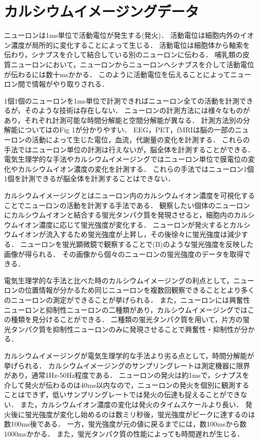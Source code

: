 \section{カルシウムイメージングデータ}
ニューロンは1ms単位で活動電位が発生する(発火)．
活動電位は細胞内外のイオン濃度が局所的に変化することによって生じる．
活動電位は細胞体から軸索を伝わり，シナプスを介して結合している別のニューロンに伝わる．
哺乳類の皮質ニューロンにおいて，ニューロンからニューロンへシナプスを介して活動電位が伝わるには数十msかかる\cite{Izhikevich2004}．
このように活動電位を伝えることによってニューロン間で情報がやり取りされる．

1個1個のニューロンを1ms単位で計測できればニューロン全ての活動を計測できるが，そのような技術は存在しない．
ニューロンの計測方法には様々なものがあり，それぞれ計測可能な時間分解能と空間分解能が異なる．
計測方法別の分解能については\cite{Sejnowski2014}のFig 1が分かりやすい．
EEG，PET，fMRIは脳の一部のニューロンの活動によって生じた電位，血流，代謝量の変化を計測する．
これらの手法ではニューロン単位の計測は行えないが，脳全体を計測することができる．
電気生理学的な手法やカルシウムイメージングではニューロン単位で膜電位の変化やカルシウムイオン濃度の変化を計測する．
これらの手法ではニューロン1個1個を計測できるが脳全体を計測することはできない．

カルシウムイメージングとはニューロン内のカルシウムイオン濃度を可視化することでニューロンの活動を計測する手法である．
観察したい個体のニューロンにカルシウムイオンと結合する蛍光タンパク質を発現させると，細胞内のカルシウムイオン濃度に応じて蛍光強度が変化する．
ニューロンが発火するとカルシウムイオンが流入するため蛍光強度が上昇し，その後徐々に蛍光強度は減少する．
ニューロンを蛍光顕微鏡で観察することで(B)のような蛍光強度を反映した画像が得られる．
その画像から個々のニューロンの蛍光強度のデータを取得できる．

電気生理学的な手法と比べた時のカルシウムイメージングの利点として，ニューロンの位置情報が分かるため同じニューロンを複数回観察できることとより多くのニューロンの測定ができることが挙げられる．
また，ニューロンには興奮性ニューロンと抑制性ニューロンの二種類があり，カルシウムイメージングではこの種類を見分けることができる．
二種類の蛍光タンパク質を用いて，片方の蛍光タンパク質を抑制性ニューロンのみに発現させることで興奮性・抑制性が分かる．

カルシウムイメージングが電気生理学的な手法より劣る点として，時間分解能が挙げられる．
カルシウムイメージングのサンプリングレートは測定機器に限界があり\cite{Nakamura2003}，通常1Hz-50Hz程度である．
ニューロンの発火は約1msで，シナプスを介して発火が伝わるのは40ms以内\cite{Bi1998}なので，ニューロンの発火を個別に観測することはできず，低いサンプリングレートでは発火の伝達も捉えることができない．
また，カルシウムイオン濃度の変化は発火のタイムスケールより長い．
発火後に蛍光強度が変化し始めるのは数ミリ秒後，蛍光強度がピークに達するのは数100ms後である．
一方，蛍光強度が元の値に戻るまでには，数100msから数1000msかかる\cite{Hira2018}．
また，蛍光タンパク質の性能によっても時間遅れが生じる．

